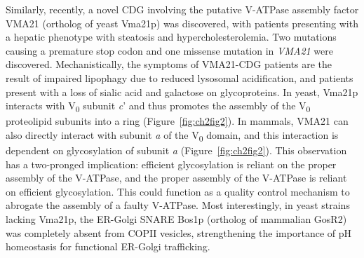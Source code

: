 Similarly, recently, a novel CDG involving the putative V-ATPase assembly factor VMA21 (ortholog of yeast Vma21p) was discovered, with patients presenting with a hepatic phenotype with steatosis and hypercholesterolemia\cite{cannata_serio_mutations_2020}. Two mutations causing a premature stop codon and one missense mutation in \emph{VMA21} were discovered. Mechanistically, the symptoms of VMA21-CDG patients are the result of impaired lipophagy due to reduced lysosomal acidification, and patients present with a loss of sialic acid and galactose on glycoproteins\cite{cannata_serio_mutations_2020}. In yeast, Vma21p interacts with V\textsubscript{0} subunit \emph{c}’ and thus promotes the assembly of the V\textsubscript{0} proteolipid subunits into a ring (Figure~\ref{fig:ch2fig2})\cite{davis-kaplan_pkr1_2006,malkus_role_2004}. In mammals, VMA21 can also directly interact with subunit \emph{a} of the V\textsubscript{0} domain, and this interaction is dependent on glycosylation of subunit \emph{a} (Figure~\ref{fig:ch2fig2})\cite{esmail_n-linked_2016,esmail_n-linked_2017}. This observation has a two-pronged implication: efficient glycosylation is reliant on the proper assembly of the V-ATPase, and the proper assembly of the V-ATPase is reliant on efficient glycosylation. This could function as a quality control mechanism to abrogate the assembly of a faulty V-ATPase. Most interestingly, in yeast strains lacking Vma21p, the ER-Golgi SNARE Bos1p (ortholog of mammalian GosR2\cite{dingjan_endosomal_2018,linders_stx5-mediated_2019}) was completely absent from COPII vesicles\cite{welsh_genetic_2006}, strengthening the importance of pH homeostasis for functional ER-Golgi trafficking.

